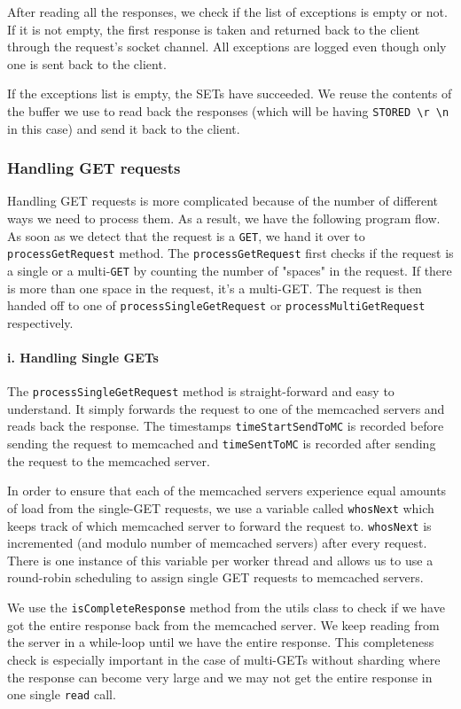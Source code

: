 \documentclass[11pt,a4paper]{article}
\begin{document}
	After reading all the responses, we check if the list of exceptions is empty or not. If it is not empty, the first response is taken and returned back to the client through the request's socket channel. All exceptions are logged even though only one is sent back to the client.
	
	If the exceptions list is empty,  the SETs have succeeded. We reuse the contents of the buffer we use to read back the responses (which will be having \texttt{STORED \textbackslash r \textbackslash n} in this case) and send it back to the client.
	
	\subsubsection{Handling GET requests}
	Handling GET requests is more complicated because of the number of different ways we need to process them. As a result, we have the following program flow.  As soon as we detect that the request is a \texttt{GET}, we hand it over to \texttt{processGetRequest} method. The \texttt{processGetRequest} first checks if the request is a single or a multi-\texttt{GET} by counting the number of "spaces" in the request. If there is more than one space in the request, it's a multi-GET. The request is then handed off to one of \texttt{processSingleGetRequest} or \texttt{processMultiGetRequest} respectively. 
	
	\paragraph{i. Handling Single GETs}
	The \texttt{processSingleGetRequest} method is straight-forward and easy to understand. It simply forwards the request to one of the memcached servers and reads back the response. The timestamps \texttt{timeStartSendToMC} is recorded before sending the request to memcached and \texttt{timeSentToMC} is recorded after sending the request to the memcached server.
	
	In order to ensure that each of the memcached servers experience equal amounts of load from the single-GET requests, we use a variable called \texttt{whosNext} which keeps track of which memcached server to forward the request to. \texttt{whosNext} is incremented (and modulo number of memcached servers) after every request. There is one instance of this variable per worker thread and allows us to use a round-robin scheduling to assign single GET requests to memcached servers.
	
	We use the \texttt{isCompleteResponse} method from the utils class to check if we have got the entire response back from the memcached server. We keep reading from the server in a while-loop until we have the entire response. This completeness check is especially important in the case of multi-GETs without sharding where the response can become very large and we may not get the entire response in one single \texttt{read} call.
	
\end{document}
